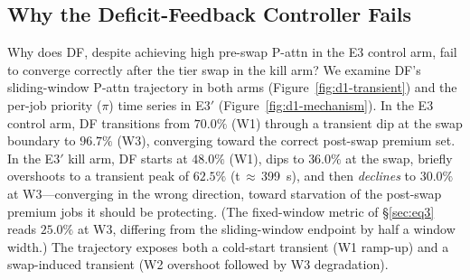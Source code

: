 \subsection{Why the Deficit-Feedback Controller Fails}
\label{sec:eq4}

Why does DF, despite achieving high pre-swap P-attn in the E3 control arm, fail to converge correctly after the tier swap in the kill arm? We examine DF's sliding-window P-attn trajectory in both arms (Figure~\ref{fig:d1-transient}) and the per-job priority ($\pi$) time series in E3$'$ (Figure~\ref{fig:d1-mechanism}). In the E3 control arm, DF transitions from $70.0\%$ (W1) through a transient dip at the swap boundary to $96.7\%$ (W3), converging toward the correct post-swap premium set. In the E3$'$ kill arm, DF starts at $48.0\%$ (W1), dips to $36.0\%$ at the swap, briefly overshoots to a transient peak of $62.5\%$ (t$\,\approx\,$399~s), and then \emph{declines} to $30.0\%$ at W3---converging in the wrong direction, toward starvation of the post-swap premium jobs it should be protecting. (The fixed-window metric of \S\ref{sec:eq3} reads $25.0\%$ at W3, differing from the sliding-window endpoint by half a window width.) The trajectory exposes both a cold-start transient (W1 ramp-up) and a swap-induced transient (W2 overshoot followed by W3 degradation).

